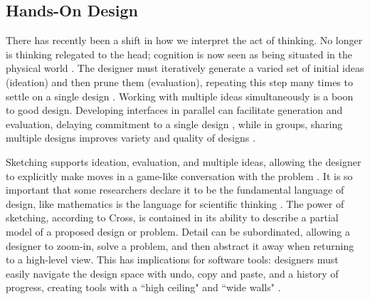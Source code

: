 \subsection{Hands-On Design}
There has recently been a shift in how we interpret the act of thinking.
No longer is thinking relegated to the head; cognition is now seen as being situated in the physical world \cite{Hutchins1995}.
The designer must iteratively generate a varied set of initial ideas  (ideation) and then prune them (evaluation), repeating this step many times to settle on a single design \cite{Buxton2007}.
Working with multiple ideas simultaneously is a boon to good design.
Developing interfaces in parallel can facilitate generation and evaluation, delaying commitment to a single design \cite{Hartmann2008, Resnick2008}, while
in groups, sharing multiple designs improves variety and quality of designs \cite{Dow2011}.


Sketching supports ideation, evaluation, and multiple ideas,
allowing the designer to
explicitly make moves in a game-like conversation with the problem \cite{Schon1982}.
It is so important that some researchers declare it to be the fundamental language of design, like mathematics is the language for scientific thinking \cite{Cross2006}.
The power of sketching, according to Cross, is contained in its ability to describe a partial model of a proposed design or problem.
Detail can be subordinated, allowing a designer to zoom-in, solve a problem, and then
abstract it away when returning to a high-level view.
This has implications for software tools: designers must easily navigate the design space with undo, copy and paste, and a history of progress, creating tools with a ``high ceiling" and ``wide walls" \cite{Resnick2008}.


